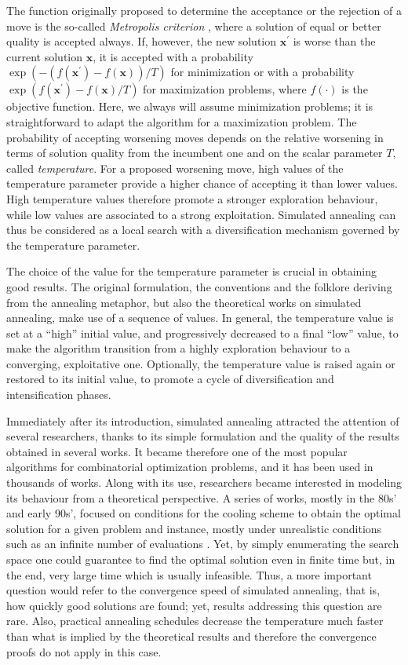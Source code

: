 The function originally proposed to determine the acceptance
or the rejection of a move is the so-called \textit{Metropolis criterion} \cite{MetRosRosTel53},
where a solution of equal or better quality is accepted always. If, however, the new solution $\mathbf{x^\prime}$ is worse than 
the current solution $\mathbf{x}$, it is accepted with a probability $\exp{(-(f(\mathbf{x^\prime}) - f(\mathbf{x}))/T)}$ for 
minimization or with a probability $\exp{(f(\mathbf{x^\prime}) - f(\mathbf{x})/T)}$ for maximization problems, where $f(\cdot)$ is the objective function. 
Here, we always will assume minimization problems; it is straightforward 
to adapt the algorithm for a maximization problem.
The probability of accepting worsening moves depends 
on the relative worsening in terms of
solution quality from the incumbent one and on the scalar parameter $T$, called \textit{temperature}.
For a proposed worsening move, high values of the temperature parameter provide a higher chance of 
accepting it than lower values. High temperature values therefore promote a stronger exploration behaviour,
while low values are associated to a strong exploitation.
Simulated annealing can thus be considered as a local search with 
a diversification mechanism governed by the temperature parameter.

The choice of the value for the temperature parameter is crucial in obtaining good results. 
The original formulation, the conventions and the folklore deriving
from the annealing metaphor, but
also the theoretical works on simulated annealing, make use of a sequence of values.
In general, the temperature value is set at a ``high'' initial value,
and progressively decreased to a final ``low'' value, to make
the algorithm transition from a highly exploration behaviour to a converging,
exploitative one. Optionally, the temperature value is raised again or restored
to its initial value, to promote a cycle of diversification and intensification
phases.

Immediately after its introduction, simulated annealing attracted the attention of 
several researchers, thanks to its simple formulation and the quality
of the results obtained in several works. 
It became therefore one of the most popular algorithms for combinatorial
optimization problems, and it has been used in thousands of works.
Along with its use, researchers became interested in modeling its behaviour from
a theoretical perspective. A series of works, mostly in the 80s' and early 90s',
focused on conditions for the cooling scheme to obtain the optimal solution for a
given problem and instance, mostly under unrealistic conditions such as an
infinite number of evaluations \cite{GemGem1984,LundyMees1986,Hajek1988,RomSan1991}. 
Yet, by simply enumerating the
search space one could guarantee to find the optimal solution even in
finite time but, in the end, very large time which is usually infeasible.  
Thus, a more important question would refer to the
convergence speed of simulated annealing, that is, how quickly good solutions are found; yet, results addressing this
question are rare. Also, practical annealing schedules decrease the
temperature much faster than what is implied by the theoretical results and
therefore the convergence proofs do not apply in this case. 


